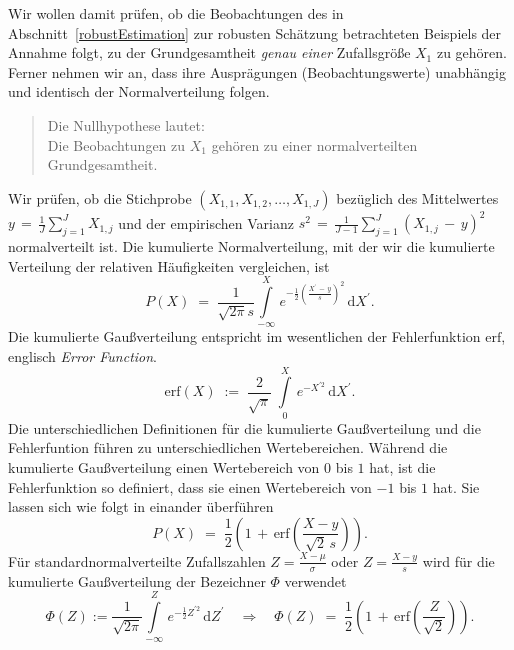 Wir wollen damit prüfen, ob die Beobachtungen des in Abschnitt~\ref{robustEstimation} zur robusten
Schätzung betrachteten Beispiels der Annahme folgt, zu der Grundgesamtheit \textsl{genau einer}
Zufallsgröße $X_1$ zu gehören. Ferner nehmen wir an, dass ihre Ausprägungen (Beobachtungswerte)
unabhängig und identisch der Normalverteilung folgen.
\begin{quote}
Die Nullhypothese lautet:\\
Die Beobachtungen zu $X_1$ gehören zu einer
normalverteilten Grundgesamtheit.
\end{quote}
Wir prüfen, ob die Stichprobe $(X_{1,1}, X_{1,2}, \dots, X_{1,J})$ bezüglich
des Mittelwertes $y \, = \, \frac{1}{J} \sum_{j=1}^J X_{1,j}$ und der
empirischen Varianz $s^2 \, = \, \frac{1}{J-1} \sum_{j=1}^J (X_{1,j} \, - \, y)^2$ normalverteilt
ist. Die kumulierte Normalverteilung, mit der wir die kumulierte Verteilung der relativen Häufigkeiten
vergleichen, ist
\begin{equation}
P(X) \; = \;  \frac{1}{\sqrt{2\pi} s}
\int\limits_{-\infty}^X \, e^{-\frac{1}{2}\left(\frac{X^\prime \, - \, y}{s}\right)^2} \, \mathrm{d} X^\prime.
\label{cdfKS}
\end{equation}
Die kumulierte Gaußverteilung entspricht im wesentlichen der
Fehlerfunktion $\mathrm{erf}$, englisch \textsl{Error Function}.
\begin{equation}
\mathrm{erf}(X) \; := \; \frac{2}{\sqrt{\pi}} \; \int\limits_0^X \, e^{-X^{\prime 2}} \, \mathrm{d} X^\prime.
\label{erf}
\end{equation}
Die unterschiedlichen Definitionen für die kumulierte Gaußverteilung
und die Fehlerfuntion führen zu unterschiedlichen Wertebereichen.
Während die kumulierte Gaußverteilung einen Wertebereich von $0$ bis $1$ hat, ist die Fehlerfunktion so
definiert, dass sie einen Wertebereich von $-1$ bis $1$ hat. Sie lassen sich wie folgt in einander
überführen
\begin{equation}
P(X) \; = \; \frac{1}{2} \left(1 \, + \, \mathrm{erf}(\frac{X - y}{\sqrt{2} \, s})\right).
\end{equation}
Für standardnormalverteilte Zufallszahlen $Z = \frac{X-\mu}{\sigma}$ oder $Z = \frac{X-y}{s}$
wird für die kumulierte Gaußverteilung der Bezeichner $\Phi$ verwendet
\begin{equation}
 \Phi(Z) := \frac{1}{\sqrt{2\pi}}
\int\limits_{-\infty}^Z \, e^{-\frac{1}{2} Z^{\prime 2} } \, \mathrm{d} Z^\prime
\quad \Rightarrow \quad
\Phi(Z) \; = \; \frac{1}{2} \left(1 \, + \, \mathrm{erf}(\frac{Z}{\sqrt{2}})\right).
\label{cdfPhi}
\end{equation}

